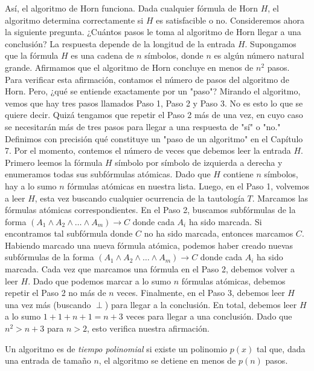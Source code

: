 \documentclass[12pt,a4paper]{book}
\newcommand{\comillas}[1]{"#1"}
\begin{document}
    Así, el algoritmo de Horn funciona. Dada cualquier fórmula de Horn $H$, el algoritmo determina correctamente si $H$ es
    satisfacible o no. Consideremos ahora la siguiente pregunta. ¿Cuántos pasos le toma al algoritmo de Horn llegar a una
    conclusión? La respuesta depende de la longitud de la entrada $H$. Supongamos que la fórmula $H$ es una cadena de $n$
    símbolos, donde $n$ es algún número natural grande. Afirmamos que el algoritmo de Horn concluye en menos de $n^{2}$
    pasos.\\
    Para verificar esta afirmación, contamos el número de pasos del algoritmo de Horn. Pero, ¿qué se entiende exactamente
    por un \comillas{paso}? Mirando el algoritmo, vemos que hay tres pasos llamados Paso 1, Paso 2 y Paso 3. No es esto lo
    que se quiere decir. Quizá tengamos que repetir el Paso 2 más de una vez, en cuyo caso se necesitarán más de tres pasos
    para llegar a una respuesta de \comillas{sí} o \comillas{no.} Definimos con precisión qué constituye un \comillas{paso de
    un algoritmo} en el Capítulo 7. Por el momento, contemos el número de veces que debemos leer la entrada $H$.\\
    Primero leemos la fórmula $H$ símbolo por símbolo de izquierda a derecha y enumeramos todas sus subfórmulas atómicas.
    Dado que $H$ contiene $n$ símbolos, hay a lo sumo $n$ fórmulas atómicas en nuestra lista. Luego, en el Paso 1, volvemos a
    leer $H$, esta vez buscando cualquier ocurrencia de la tautología $T$. Marcamos las fórmulas atómicas correspondientes.
    En el Paso 2, buscamos subfórmulas de la forma $(A_{1}\wedge A_{2}\wedge\dots\wedge A_{m})\rightarrow C$ donde cada
    $A_{i}$ ha sido marcada. Si encontramos tal subfórmula donde $C$ no ha sido marcada, entonces marcamos $C$. Habiendo
    marcado una nueva fórmula atómica, podemos haber creado nuevas subfórmulas de la forma
    $(A_{1}\wedge A_{2}\wedge\dots\wedge A_{m})\rightarrow C$ donde cada $A_{i}$ ha sido marcada. Cada vez que marcamos una
    fórmula en el Paso 2, debemos volver a leer $H$. Dado que podemos marcar a lo sumo $n$ fórmulas atómicas, debemos repetir
    el Paso 2 no más de $n$ veces. Finalmente, en el Paso 3, debemos leer $H$ una vez más (buscando $\perp$) para llegar a la
    conclusión. En total, debemos leer $H$ a lo sumo $1+1+n+1=n+3$ veces para llegar a una conclusión. Dado que $n^{2}>n+3$
    para $n>2$, esto verifica nuestra afirmación.

    \begin{definicion}\label{def:tiempo-polinomial}
        Un algoritmo es de \textit{tiempo polinomial} si existe un polinomio $p(x)$ tal que, dada una entrada de tamaño $n$,
        el algoritmo se detiene en menos de $p(n)$ pasos.
    \end{definicion}
\end{document}
